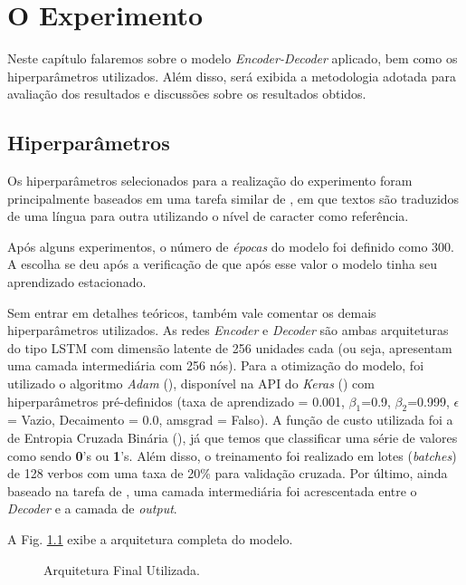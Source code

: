 \chapter{O Experimento}
\label{ch:07}

Neste capítulo falaremos sobre o modelo \textit{Encoder-Decoder} aplicado, bem como os hiperparâmetros utilizados. Além disso, será exibida a metodologia adotada para avaliação dos resultados e discussões sobre os resultados obtidos.

\section{Hiperparâmetros}
\label{sec:treinamento}

Os hiperparâmetros selecionados para a realização do experimento foram principalmente baseados em uma tarefa similar de \cite{cholletseq2seq}, em que textos são traduzidos de uma língua para outra utilizando o nível de caracter como referência.

Após alguns experimentos, o número de \textit{épocas} do modelo foi definido como 300. A escolha se deu após a verificação de que após esse valor o modelo tinha seu aprendizado estacionado.

Sem entrar em detalhes teóricos, também vale comentar os demais hiperparâmetros utilizados. As redes \textit{Encoder} e \textit{Decoder} são ambas arquiteturas do tipo LSTM com dimensão latente de 256 unidades cada (ou seja, apresentam uma camada intermediária com 256 nós). Para a otimização do modelo, foi utilizado o algoritmo \textit{Adam} (\cite{adam:2014}), disponível na API do \textit{Keras} (\cite{chollet2015keras}) com hiperparâmetros pré-definidos (taxa de aprendizado = 0.001, $\beta_{1}$=0.9, $\beta_{2}$=0.999, $\epsilon$ = Vazio, Decaimento = 0.0, amsgrad = Falso). A função de custo utilizada foi a de Entropia Cruzada Binária (\cite{francois2017deep}), já que temos que classificar uma série de valores como sendo \textbf{0}'s ou \textbf{1}'s. Além disso, o treinamento foi realizado em lotes (\textit{batches}) de 128 verbos com uma taxa de 20\% para validação cruzada. Por último, ainda baseado na tarefa de \cite{cholletseq2seq}, uma camada intermediária foi acrescentada entre o \textit{Decoder} e a camada de \textit{output}.

A Fig. \ref{fig:encoder-decoder} exibe a arquitetura completa do modelo.

\begin{figure}[H]
\caption{\label{fig:encoder-decoder} Arquitetura Final Utilizada.}
\end{figure}

